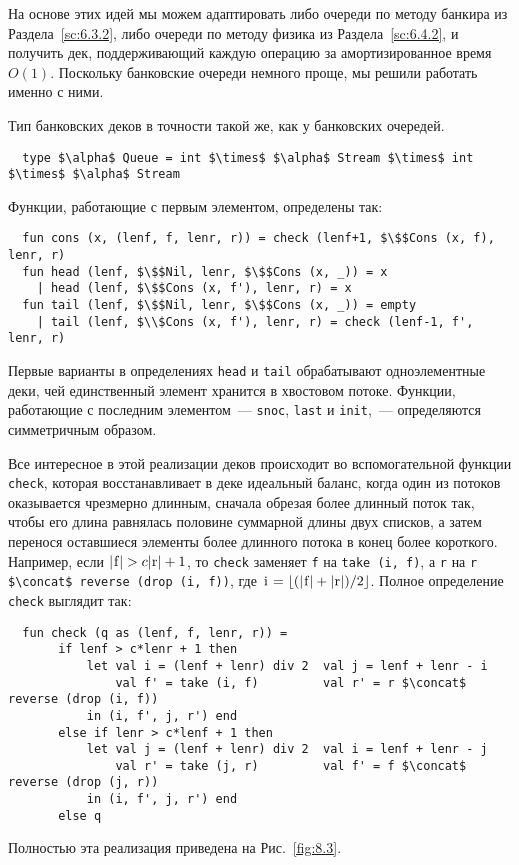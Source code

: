 На основе этих идей мы можем адаптировать либо очереди по методу
банкира из Раздела~\ref{sc:6.3.2}, либо очереди по методу физика из
Раздела~\ref{sc:6.4.2}, и получить дек, поддерживающий каждую операцию за
амортизированное время $O(1)$. Поскольку банковские очереди немного
проще, мы решили работать именно с ними.

Тип банковских деков в точности такой же, как у банковских очередей.
\begin{lstlisting}
  type $\alpha$ Queue = int $\times$ $\alpha$ Stream $\times$ int $\times$ $\alpha$ Stream
\end{lstlisting}
Функции, работающие с первым элементом, определены так:
\begin{lstlisting}
  fun cons (x, (lenf, f, lenr, r)) = check (lenf+1, $\$$Cons (x, f), lenr, r)
  fun head (lenf, $\$$Nil, lenr, $\$$Cons (x, _)) = x
    | head (lenf, $\$$Cons (x, f'), lenr, r) = x
  fun tail (lenf, $\$$Nil, lenr, $\$$Cons (x, _)) = empty
    | tail (lenf, $\\$Cons (x, f'), lenr, r) = check (lenf-1, f', lenr, r)
\end{lstlisting}
Первые варианты в определениях \lstinline!head! и \lstinline!tail!
обрабатывают одноэлементные деки, чей единственный элемент хранится в
хвостовом потоке. Функции, работающие с последним элементом~---
\lstinline!snoc!, \lstinline!last! и \lstinline!init!,~---
определяются симметричным образом.

Все интересное в этой реализации деков происходит во вспомогательной
функции \lstinline!check!, которая восстанавливает в деке идеальный
баланс, когда один из потоков оказывается чрезмерно длинным, сначала
обрезая более длинный поток так, чтобы его длина равнялась половине
суммарной длины двух списков, а затем перенося оставшиеся элементы
более длинного потока в конец более короткого. Например, если
$|\lstinline!f!| > c|\lstinline!r!| + 1$, то \lstinline!check!
заменяет \lstinline!f! на \lstinline!take (i, f)!, а \lstinline!r! на
\lstinline!r $\concat$ reverse (drop (i, f))!, где 
$\lstinline!i! = \lfloor (|\lstinline!f!| + |\lstinline!r!|) /2 \rfloor$. Полное определение \lstinline!check! выглядит так:
\begin{lstlisting}
  fun check (q as (lenf, f, lenr, r)) =
       if lenf > c*lenr + 1 then
           let val i = (lenf + lenr) div 2	val j = lenf + lenr - i
               val f' = take (i, f) 		val r' = r $\concat$ reverse (drop (i, f))
           in (i, f', j, r') end
       else if lenr > c*lenf + 1 then
           let val j = (lenf + lenr) div 2	val i = lenf + lenr - j
               val r' = take (j, r)	        val f' = f $\concat$ reverse (drop (j, r))
           in (i, f', j, r') end
       else q
\end{lstlisting}
Полностью эта реализация приведена на Рис.~\ref{fig:8.3}.

